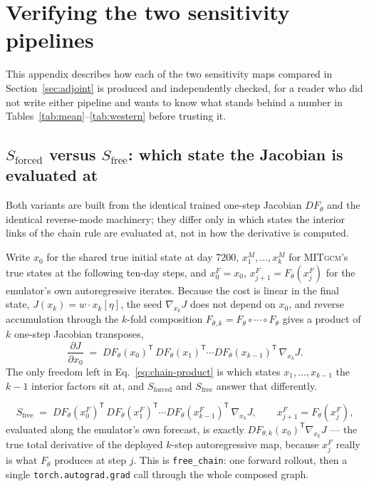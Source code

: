\documentclass[3p,12pt]{elsarticle}
\newcommand{\MITgcm}{\textsc{MITgcm}}
\newcommand{\Sforced}{S_{\mathrm{forced}}}
\begin{document}



\appendix

\section{Verifying the two sensitivity pipelines}
\label{app:trust}

This appendix describes how each of the two sensitivity maps compared in
Section~\ref{sec:adjoint} is produced and independently checked, for a reader
who did not write either pipeline and wants to know what stands behind a
number in Tables~\ref{tab:mean}--\ref{tab:western} before trusting it.

\subsection{$S_{\mathrm{forced}}$ versus $S_{\mathrm{free}}$: which state the Jacobian is evaluated at}
\label{app:forced-free}

Both variants are built from the identical trained one-step Jacobian
$DF_\theta$ and the identical reverse-mode machinery; they differ only in
which states the interior links of the chain rule are evaluated at, not in
how the derivative is computed.

Write $x_0$ for the shared true initial state at day 7200, $x_1^M,\dots,x_k^M$
for \MITgcm{}'s true states at the following ten-day steps, and $x_0^F=x_0$,
$x_{j+1}^F=F_\theta(x_j^F)$ for the emulator's own autoregressive iterates.
Because the cost is linear in the final state, $J(x_k)=w\cdot x_k[\eta]$, the
seed $\nabla_{x_k}J$ does not depend on $x_0$, and reverse accumulation
through the $k$-fold composition $F_{\theta,k}=F_\theta\circ\cdots\circ
F_\theta$ gives a product of $k$ one-step Jacobian transposes,
\begin{equation}
\frac{\partial J}{\partial x_0} \;=\;
DF_\theta(x_0)^{\mathsf T}\,DF_\theta(x_1)^{\mathsf T}\cdots
DF_\theta(x_{k-1})^{\mathsf T}\,\nabla_{x_k}J.
\label{eq:chain-product}
\end{equation}
The only freedom left in Eq.~\eqref{eq:chain-product} is which states
$x_1,\dots,x_{k-1}$ the $k-1$ interior factors sit at, and $\Sforced$ and
$S_{\mathrm{free}}$ answer that differently.

\begin{equation}
S_{\mathrm{free}} \;=\;
DF_\theta(x_0^F)^{\mathsf T}\,DF_\theta(x_1^F)^{\mathsf T}\cdots
DF_\theta(x_{k-1}^F)^{\mathsf T}\,\nabla_{x_k}J,
\qquad x_{j+1}^F = F_\theta(x_j^F),
\label{eq:sfree}
\end{equation}
evaluated along the emulator's own forecast, is exactly
$DF_{\theta,k}(x_0)^{\mathsf T}\nabla_{x_k}J$ --- the true total derivative of
the deployed $k$-step autoregressive map, because $x_j^F$ really is what
$F_\theta$ produces at step $j$. This is \texttt{free\_chain}: one forward
rollout, then a single \texttt{torch.autograd.grad} call through the whole
composed graph.
\end{document}

